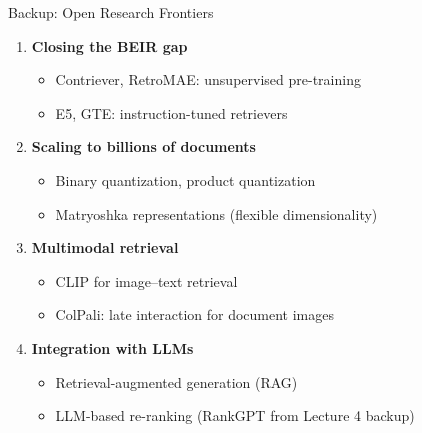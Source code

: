 \documentclass[aspectratio=169]{beamer}
\begin{document}
\begin{frame}{Backup: Open Research Frontiers}
\begin{enumerate}
    \item \textbf{Closing the BEIR gap}
    \begin{itemize}
        \item Contriever, RetroMAE: unsupervised pre-training
        \item E5, GTE: instruction-tuned retrievers
    \end{itemize}

    \vspace{0.3em}

    \item \textbf{Scaling to billions of documents}
    \begin{itemize}
        \item Binary quantization, product quantization
        \item Matryoshka representations (flexible dimensionality)
    \end{itemize}

    \vspace{0.3em}

    \item \textbf{Multimodal retrieval}
    \begin{itemize}
        \item CLIP for image--text retrieval
        \item ColPali: late interaction for document images
    \end{itemize}

    \vspace{0.3em}

    \item \textbf{Integration with LLMs}
    \begin{itemize}
        \item Retrieval-augmented generation (RAG)
        \item LLM-based re-ranking (RankGPT from Lecture 4 backup)
    \end{itemize}
\end{enumerate}
\end{frame}
\end{document}
